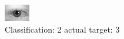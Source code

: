 \begin{figure}[h!]
\begin{center}
\includegraphics[width=0.60\columnwidth]{figures/ID561_class_2_target_3.png}
\end{center}
\caption{ Classification: 2 actual target: 3}
\label{fig:ID561_class_2_target_3}
\end{figure}
